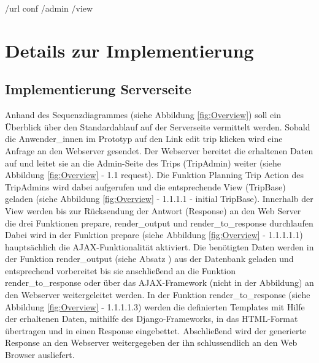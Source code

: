 \documentclass[Bachelorarbeit.tex]{subfiles}
\begin{document}
/url conf
/admin
/view

\section{Details zur Implementierung}
\label{chap:implementierung:sec:details}

\subsection{Implementierung Serverseite}
Anhand des Sequenzdiagrammes (siehe Abbildung \ref{fig:Overview}) soll ein  Überblick über den Standardablauf auf der Serverseite vermittelt werden. 
Sobald die Anwender\_innen im  Prototyp auf den Link edit trip klicken wird eine  Anfrage an den Webserver gesendet.
Der Webserver bereitet die erhaltenen Daten auf und leitet sie an die Admin-Seite des Trips (TripAdmin) weiter (siehe Abbildung \ref{fig:Overview} - 1.1 request). 
Die Funktion Planning Trip Action des TripAdmins wird dabei aufgerufen und die entsprechende View (TripBase) geladen (siehe Abbildung \ref{fig:Overview} - 1.1.1.1 - initial TripBase).
Innerhalb der View werden bis zur Rücksendung der Antwort (Response) an den Web Server die drei Funktionen prepare, render\_output und render\_to\_response durchlaufen
Dabei wird in der Funktion prepare (siehe Abbildung \ref{fig:Overview} - 1.1.1.1.1) hauptsächlich die \ac{AJAX}-Funktionalität aktiviert.
Die benötigten Daten werden in der Funktion render\_output (siehe Absatz ) aus der Datenbank geladen und entsprechend vorbereitet bis sie anschließend an die Funktion render\_to\_response oder über das \ac{AJAX}-Framework (nicht in der Abbildung) an den Webserver weitergeleitet werden.
In der Funktion render\_to\_response (siehe Abbildung \ref{fig:Overview} - 1.1.1.1.3) werden die definierten Templates mit Hilfe der erhaltenen Daten, mithilfe des Django-Frameworks, in das \ac{HTML}-Format übertragen und in einen Response eingebettet.
Abschließend wird der generierte Response an den Webserver weitergegeben der ihn schlussendlich an den Web Browser ausliefert.
\end{document}

